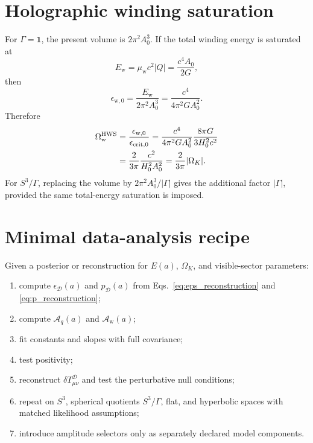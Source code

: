 \documentclass[
  aps,
  prd,
  reprint,
  superscriptaddress,
  floatfix,
  nofootinbib,
  longbibliography
]{revtex4-2}
\theoremstyle{plain}
\theoremstyle{definition}
\theoremstyle{remark}
\newcommand{\D}{\mathcal D}
\newcommand{\w}{\mathrm w}
\newcommand{\crit}{\mathrm{crit}}
\newcommand{\Aq}{\mathcal A_q}
\newcommand{\Aw}{\mathcal A_{\mathrm w}}
\newcommand{\id}{\mathbf 1}
\newcommand{\eps}{\epsilon}
\begin{document}
\section{Holographic winding saturation}

For \(\Gamma=\id\), the present volume is \(2\pi^2A_0^3\).  If the total winding energy is saturated at
\[
E_{\w}=\mu_{\w}c^2|Q|=\frac{c^4A_0}{2G},
\]
then
\[
\eps_{\w,0}=\frac{E_{\w}}{2\pi^2A_0^3}
=\frac{c^4}{4\pi^2GA_0^2}.
\]
Therefore
\[
\begin{aligned}
\Omega_{\w}^{\rm HWS}
&=
\frac{\eps_{\w,0}}{\eps_{\crit,0}}
=
\frac{c^4}{4\pi^2GA_0^2}
\frac{8\pi G}{3H_0^2c^2}\\
&=
\frac{2}{3\pi}\frac{c^2}{H_0^2A_0^2}
=
\frac{2}{3\pi}|\Omega_K|.
\end{aligned}
\]
For \(S^3/\Gamma\), replacing the volume by \(2\pi^2A_0^3/|\Gamma|\) gives the additional factor \(|\Gamma|\), provided the same total-energy saturation is imposed.

\section{Minimal data-analysis recipe}

Given a posterior or reconstruction for \(E(a)\), \(\Omega_K\), and visible-sector parameters:
\begin{enumerate}
\item compute \(\eps_\D(a)\) and \(p_\D(a)\) from Eqs.~\eqref{eq:eps_reconstruction} and \eqref{eq:p_reconstruction};
\item compute \(\Aq(a)\) and \(\Aw(a)\);
\item fit constants and slopes with full covariance;
\item test positivity;
\item reconstruct \(\delta T^\D_{\mu\nu}\) and test the perturbative null conditions;
\item repeat on \(S^3\), spherical quotients \(S^3/\Gamma\), flat, and hyperbolic spaces with matched likelihood assumptions;
\item introduce amplitude selectors only as separately declared model components.
\end{enumerate}
\end{document}
